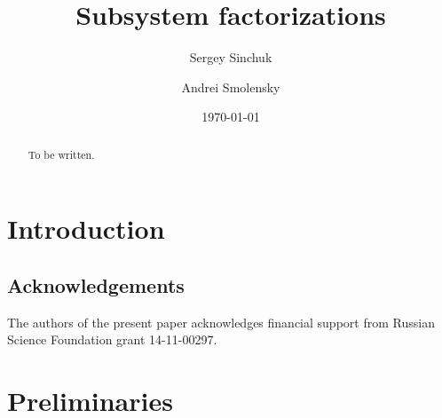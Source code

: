 \documentclass[oneside, 12pt]{amsart}
\title [Subsystem factorizations] {Subsystem factorizations}
\author{Sergey Sinchuk}
\author{Andrei Smolensky}
\date {\today}
\theoremstyle{plain}
\numberwithin{equation}{section}
\numberwithin{lemma}{section}
\theoremstyle{definition}
\theoremstyle{remark}
\begin{document}
\begin{abstract} To be written. \end{abstract}

\maketitle

\section {Introduction}\label{intro}
 
\subsection{Acknowledgements}
The authors of the present paper acknowledges financial support from Russian Science Foundation grant 14-11-00297.

\section {Preliminaries}\label{prelim}
\end{document}
